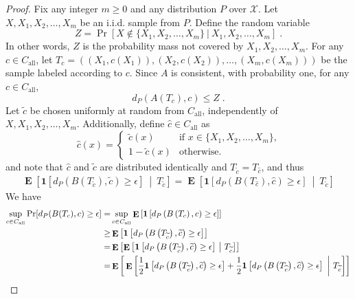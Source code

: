 \documentclass[11pt]{article}
\newcommand{\X}{\mathcal{X}}
\newcommand{\indicator}[1]{\mathbf{1}\left[{#1}\right]}
\DeclareMathOperator{\Exp}{\mathbf{E}}
\begin{document}
\begin{proof}
Fix any integer $m \ge 0$ and any distribution $P$ over $\X$. Let $X, X_1, X_2,
\dots, X_m$ be an i.i.d. sample from $P$.
Define the random variable
$$
Z = \Pr[X \not \in \{X_1, X_2, \dots, X_m\} ~|~ X_1, X_2, \dots, X_m] \; .
$$
In other words, $Z$ is the probability mass not covered by $X_1, X_2, \dots, X_m$.
For any $c \in C_{\text{all}}$, let
$T_c = ((X_1, c(X_1)), (X_2, c(X_2)), \dots, (X_m, c(X_m)))$ be the sample labeled
according to $c$. Since $A$ is consistent, with probability one,
for any $c \in C_{\text{all}}$,
\begin{equation}
\label{equation:relate-dP-to-Z}
d_P(A(T_c),c) \leq Z \;.
\end{equation}
Let $\widetilde c$ be chosen uniformly at random from
$C_{\text{all}}$, independently of $X, X_1, X_2, \dots, X_m$.
Additionally, define $\widehat c \in C_{\text{all}}$ as
$$
\widehat c(x) =
\begin{cases}
\widetilde{c}(x) & \text{if $x \in \{X_1, X_2, \dots, X_m\}$,} \\
1 - \widetilde{c}(x) & \text{otherwise}.
\end{cases}
$$
and note that $\widehat c$ and $\widetilde c$ are distributed identically and $T_{\widetilde{c}} = T_{\widehat{c}}$, and  thus
\begin{align}
\Exp \left[ \indicator{d_P \left(B\left( T_{\widetilde c} \right), \widetilde c \right) \ge \epsilon} ~\middle|~ T_{\widetilde{c}} \right]
=\Exp \left[ \indicator{d_P \left(B\left( T_{\widehat c} \right), \widehat c \right) \ge \epsilon} ~\middle|~ T_{\widetilde{c}} \right]
\label{eq: widehatc and widetildec are identically distributed}
\end{align}
We have
\begin{align}
\sup_{c \in C_{\text{all}}} \Pr[d_P(B(T_c),c) \ge \epsilon]
= & \sup_{c \in C_{\text{all}}} \Exp \left[ \indicator{d_P \left(B\left( T_c\right), c \right) \ge \epsilon} \right] \notag \\
\ge & \Exp \left[ \indicator{d_P \left(B\left( T_{\widetilde c} \right), \widetilde c \right) \ge \epsilon} \right] \notag \\
= & \Exp \left[ \Exp \left[ \indicator{d_P \left(B\left( T_{\widetilde c} \right), \widetilde c \right) \ge \epsilon} ~\middle|~ T_{\widetilde{c}} \right] \right] \notag \\
= & \Exp \bigg[\Exp \bigg[\frac{1}{2}  \indicator{d_P \left(B\left( T_{\widetilde c} \right), \widetilde c \right) \ge \epsilon}  + \frac{1}{2} \indicator{d_P \left(B\left( T_{\widehat c} \right), \widehat c \right) \ge \epsilon} ~\bigg|~ T_{\widetilde{c}} \bigg] \bigg]

\end{align}
\end{proof}
\end{document}
